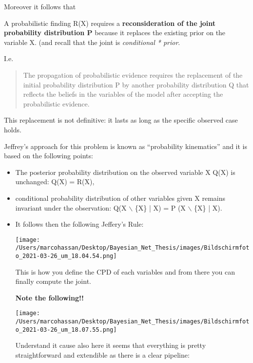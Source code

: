 \documentclass[a4paper]{article}
\begin{document}
\begin{enumerate}
Moreover it follows that

A probabilistic finding R(X) requires a \textbf{reconsideration of the
joint probability distribution P} because it replaces the existing
prior on the variable X. (and recall that the joint is
\emph{conditional * prior}.

I.e.

\begin{quote}
The propagation of probabilistic evidence requires the
replacement of the initial probability distribution P by
another probability distribution Q that reflects the beliefs in
the variables of the model after accepting the probabilistic
evidence.
\end{quote}

This replacement is not definitive: it lasts as long as the
specific observed case holds.

Jeffrey’s approach for this problem is known as “probability
kinematics” and it is based on the following points:

\begin{itemize}
\item The posterior probability distribution on the observed variable
X Q(X) is unchanged: Q(X) = R(X),

\item conditional probability distribution of other variables given X
remains invariant under the observation: Q(X $\backslash$ \{X\} | X) = P (X
$\backslash$ \{X\} | X).

\item It follows then the following Jeffery's Rule:

\begin{center}
\texttt{[image: /Users/marcohassan/Desktop/Bayesian\_Net\_Thesis/images/Bildschirmfoto\_2021-03-26\_um\_18.04.54.png]}
\end{center}

This is how you define the CPD of each variables and from there
you can finally compute the joint.

\textbf{Note the following!!}

\begin{center}
\texttt{[image: /Users/marcohassan/Desktop/Bayesian\_Net\_Thesis/images/Bildschirmfoto\_2021-03-26\_um\_18.07.55.png]}
\end{center}

Understand it cause also here it seems that everything is
pretty straightforward and extendible as there is a clear
pipeline:


\end{itemize}
\end{enumerate}
\end{document}
